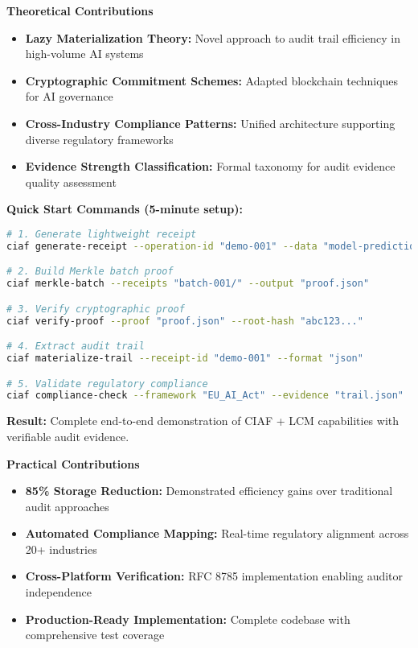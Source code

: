 \documentclass[12pt,a4paper]{article}
\begin{document}
\begin{valuebox}
\textbf{Theoretical Contributions}
\begin{itemize}
\item \textbf{Lazy Materialization Theory:} Novel approach to audit trail efficiency in high-volume AI systems
\item \textbf{Cryptographic Commitment Schemes:} Adapted blockchain techniques for AI governance
\item \textbf{Cross-Industry Compliance Patterns:} Unified architecture supporting diverse regulatory frameworks
\item \textbf{Evidence Strength Classification:} Formal taxonomy for audit evidence quality assessment
\end{itemize}

\begin{tcolorbox}[colframe=green!50, colback=green!5, title={\textbf{Reproduce the Demo}}]
\textbf{Quick Start Commands (5-minute setup):}
\begin{lstlisting}[language=bash]
# 1. Generate lightweight receipt
ciaf generate-receipt --operation-id "demo-001" --data "model-predictions.json"

# 2. Build Merkle batch proof
ciaf merkle-batch --receipts "batch-001/" --output "proof.json"

# 3. Verify cryptographic proof
ciaf verify-proof --proof "proof.json" --root-hash "abc123..."

# 4. Extract audit trail
ciaf materialize-trail --receipt-id "demo-001" --format "json"

# 5. Validate regulatory compliance
ciaf compliance-check --framework "EU_AI_Act" --evidence "trail.json"
\end{lstlisting}
\textbf{Result:} Complete end-to-end demonstration of CIAF + LCM capabilities with verifiable audit evidence.
\end{tcolorbox}

\textbf{Practical Contributions}
\begin{itemize}
\item \textbf{85\% Storage Reduction:} Demonstrated efficiency gains over traditional audit approaches
\item \textbf{Automated Compliance Mapping:} Real-time regulatory alignment across 20+ industries
\item \textbf{Cross-Platform Verification:} RFC 8785 implementation enabling auditor independence
\item \textbf{Production-Ready Implementation:} Complete codebase with comprehensive test coverage
\end{itemize}
\end{valuebox}
\end{document}
